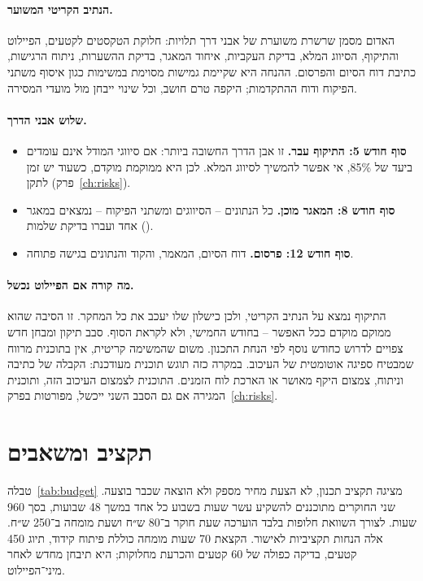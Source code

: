 \paragraph{הנתיב הקריטי המשוער.} האדום מסמן שרשרת משוערת של אבני דרך תלויות: חלוקת הטקסטים לקטעים, הפיילוט והתיקוף, הסיווג המלא, בדיקת העקביות, איחוד המאגר, בדיקת ההשערות, ניתוח הרגישות, כתיבת דוח הסיום והפרסום. ההנחה היא שקיימת גמישות מסוימת במשימות כגון איסוף משתני הפיקוח ודוח ההתקדמות; היקפה טרם חושב, וכל שינוי ייבחן מול מועדי המסירה.

\paragraph{שלוש אבני הדרך.}
\begin{itemize}
  \item \textbf{סוף חודש 5: התיקוף עבר.} זו אבן הדרך החשובה ביותר: אם סיווגי המודל אינם עומדים ביעד של 85\%, אי אפשר להמשיך לסיווג המלא. לכן היא ממוקמת מוקדם, כשעוד יש זמן לתקן (פרק~\ref{ch:risks}).
  \item \textbf{סוף חודש 8: המאגר מוכן.} כל הנתונים – הסיווגים ומשתני הפיקוח – נמצאים במאגר אחד ועברו בדיקת שלמות ().
  \item \textbf{סוף חודש 12: פרסום.} דוח הסיום, המאמר, והקוד והנתונים בגישה פתוחה.
\end{itemize}

\paragraph{מה קורה אם הפיילוט נכשל.} התיקוף נמצא על הנתיב הקריטי, ולכן כישלון שלו יעכב את כל המחקר. זו הסיבה שהוא ממוקם מוקדם ככל האפשר – בחודש החמישי, ולא לקראת הסוף. סבב תיקון ומבחן חדש צפויים לדרוש כחודש נוסף לפי הנחת התכנון. משום שהמשימה קריטית, אין בתוכנית מרווח שמבטיח ספיגה אוטומטית של העיכוב. במקרה כזה תוגש תוכנית מעודכנת: הקבלה של כתיבה וניתוח, צמצום היקף מאושר או הארכת לוח הזמנים. התוכנית לצמצום העיכוב הזה, ותוכנית המגירה אם גם הסבב השני ייכשל, מפורטות בפרק~\ref{ch:risks}.


\section{תקציב ומשאבים}
\label{sec:wp-budget}

טבלה~\ref{tab:budget} מציגה תקציב תכנון, לא הצעת מחיר מספק ולא הוצאה שכבר בוצעה. שני החוקרים מתוכננים להשקיע עשר שעות בשבוע כל אחד במשך 48 שבועות, בסך 960 שעות. לצורך השוואת חלופות בלבד הוערכה שעת חוקר ב־80 ש״ח ושעת מומחה ב־250 ש״ח. אלה הנחות תקציביות לאישור. הקצאת 70 שעות מומחה כוללת פיתוח קידוד, תיוג 450 קטעים, בדיקה כפולה של 60 קטעים והכרעת מחלוקות; היא תיבחן מחדש לאחר מיני־הפיילוט.

